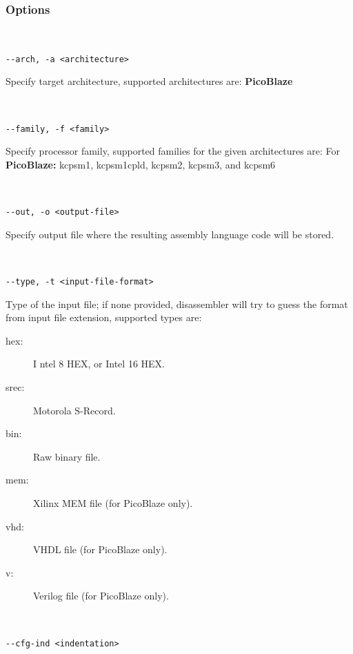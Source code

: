            \subsubsection{Options}
                {
                ~\\
                \usecodefont

                \verb'--arch, -a <architecture>'\\
                }
                Specify target architecture, supported architectures are: \textbf{PicoBlaze}
                {
                ~\\
                \usecodefont

                \verb'--family, -f <family>'\\
                }
                Specify processor family, supported families for the given architectures are:  For \textbf{PicoBlaze:} kcpsm1, kcpsm1cpld, kcpsm2, kcpsm3, and kcpsm6
                {
                ~\\
                \usecodefont

                \verb'--out, -o <output-file>'\\
                }
                Specify output file where the resulting assembly language code will be stored.
                {
                ~\\
                \usecodefont

                \verb'--type, -t <input-file-format>'\\
                }
                 Type of the input file; if none provided, disassembler will try to guess the format from input file extension, supported types are:
                 \begin{description}
                  \item [hex:]I ntel 8 HEX, or Intel 16 HEX.
                  \item [srec:] Motorola S-Record.
                  \item [bin:] Raw binary file.
                  \item [mem:] Xilinx MEM file (for PicoBlaze only).
                  \item [vhd:] VHDL file (for PicoBlaze only).
                  \item [v:] Verilog file (for PicoBlaze only).
                 \end{description}
                {
                ~\\
                \usecodefont

                \verb'--cfg-ind <indentation>'\\
                }
